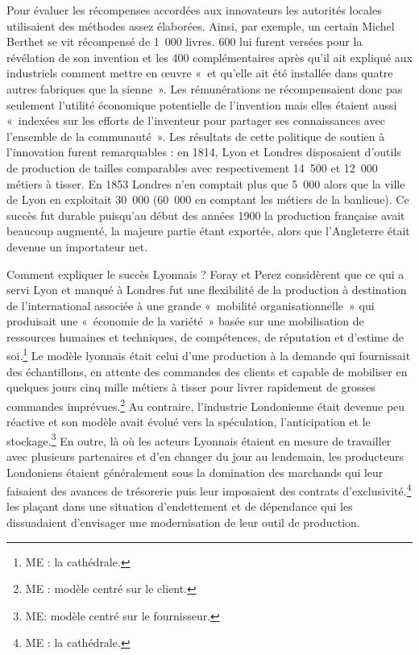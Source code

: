 \documentclass{FramateX}
\begin{document}
\begin{refsection}
Pour évaluer les récompenses accordées aux innovateurs
les autorités locales utilisaient des méthodes assez élaborées. Ainsi,
par exemple, un certain Michel Berthet se vit récompensé de 1~000
livres. 600 lui furent versées pour la révélation de son invention et
les 400 complémentaires après qu'il ait expliqué aux industriels
comment mettre en œuvre «~et qu'elle ait été installée dans
quatre autres fabriques que la sienne~». Les rémunérations ne
récompensaient donc pas seulement l'utilité économique potentielle de
l'invention mais elles étaient aussi «~indexées sur les efforts
de l'inventeur pour partager ses connaissances avec l'ensemble de la
communauté~». Les résultats de cette politique de soutien à
l'innovation furent remarquables : en 1814, Lyon et Londres disposaient
d'outils de production de tailles comparables avec respectivement
14~500 et 12~000 métiers à tisser. En 1853 Londres n'en comptait plus
que 5~000 alors que la ville de Lyon en exploitait 30~000 (60~000 en
comptant les métiers de la banlieue). Ce succès fut durable puisqu'au
début des années 1900 la production française avait beaucoup augmenté,
la majeure partie étant exportée, alors que l'Angleterre était devenue
un importateur net.

Comment expliquer le succès Lyonnais ? Foray et Perez considèrent que ce
qui a servi Lyon et manqué à Londres fut une flexibilité de la
production à destination de l'international associée à une grande
«~mobilité organisationnelle~» qui produisait une «~économie de la
variété~» basée sur une mobilisation de ressources humaines et
techniques, de compétences, de réputation et d'estime de
soi.\footnote{ME : la cathédrale.} Le modèle lyonnais était celui d'une
production à la demande qui fournissait des échantillons, en attente
des commandes des clients et capable de mobiliser en quelques jours
cinq mille métiers à tisser pour livrer rapidement de grosses commandes
imprévues.\footnote{ME : modèle centré sur le client.} Au contraire,
l'industrie Londonienne était devenue peu réactive et son modèle avait
évolué vers la spéculation, l'anticipation et le stockage.\footnote{ME: modèle centré sur le fournisseur.} En outre, là où les acteurs
Lyonnais étaient en mesure de travailler avec plusieurs partenaires et
d'en changer du jour au lendemain, les producteurs Londoniens étaient
généralement sous la domination des marchands qui leur faisaient des
avances de trésorerie puis leur imposaient des contrats
d'exclusivité.\footnote{ME : la cathédrale.} les plaçant dans une
situation d'endettement et de dépendance qui les dissuadaient
d'envisager une modernisation de leur outil de production.


\end{refsection}
\end{document}
